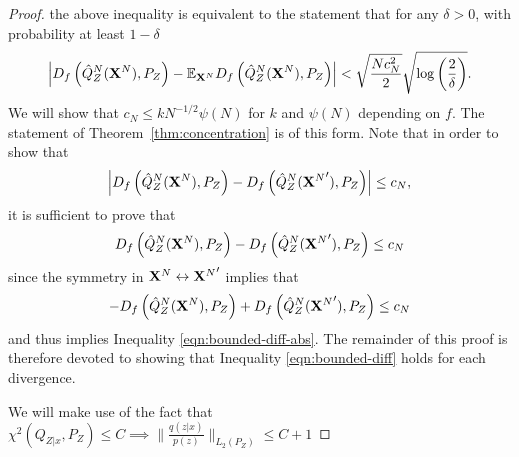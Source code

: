 \begin{proof}
the above inequality is equivalent to the statement that for any $\delta>0$, with probability at least $1-\delta$ 
\begin{align*}
    \left| D_f\left( \hat{Q}_Z^N(\mathbf{X}^N) , P_Z\right) - \mathbb{E}_{\mathbf{X}^N} D_f\left( \hat{Q}_Z^N(\mathbf{X}^N) , P_Z\right) \right| < \sqrt{\frac{Nc_N^2}{2}} \sqrt{\log\left(\frac{2}{\delta}\right)}.
\end{align*}
We will show that $c_N \leq k N^{-1/2} \psi(N)$ for $k$ and $\psi(N)$ depending on $f$.
The statement of Theorem~\ref{thm:concentration} is of this form.
Note that in order to show that
\begin{align}\label{eqn:bounded-diff-abs}
    \left|D_f\left( \hat{Q}_Z^N(\mathbf{X}^N) , P_Z\right) - D_f\left( \hat{Q}_Z^N({\mathbf{X}^N}') , P_Z\right)\right| \leq c_N,
\end{align}
it is sufficient to prove that 
\begin{align}\label{eqn:bounded-diff}
     D_f\left( \hat{Q}_Z^N(\mathbf{X}^N) , P_Z\right) - D_f\left( \hat{Q}_Z^N({\mathbf{X}^N}') , P_Z\right) \leq c_N
\end{align}
since the symmetry in $\mathbf{X}^N \leftrightarrow {\mathbf{X}^N}'$ implies that
\begin{align}
    - D_f\left( \hat{Q}_Z^N(\mathbf{X}^N) , P_Z\right) + D_f\left( \hat{Q}_Z^N({\mathbf{X}^N}') , P_Z\right) \leq c_N
\end{align}
and thus implies Inequality \ref{eqn:bounded-diff-abs}.
The remainder of this proof is therefore devoted to showing that Inequality \ref{eqn:bounded-diff} holds for each divergence.

We will make use of the fact that $\chi^2\left(Q_{Z|x} , P_Z\right) \leq C \implies \bigl\| \frac{q(z|x)}{p(z)} \bigr\|_{L_2(P_Z)} \leq C+1 $


\end{proof}
